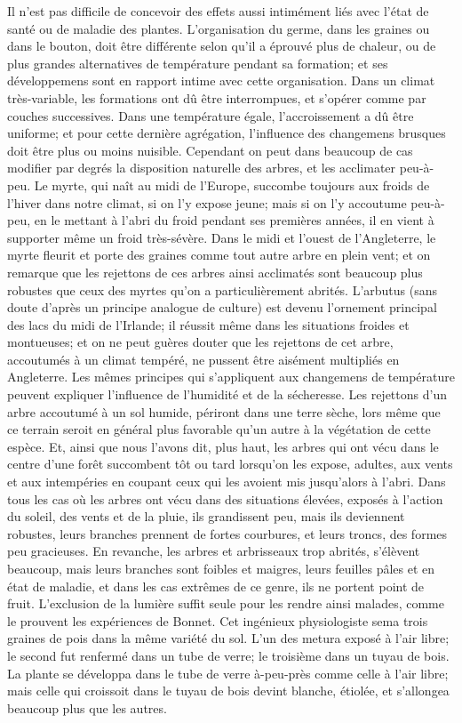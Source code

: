 Il n'est pas difficile de concevoir des effets aussi intimément liés avec l'état de santé ou de maladie des plantes. L'organisation du germe, dans les graines ou dans le bouton, doit être différente selon qu'il a éprouvé plus de chaleur, ou de plus grandes alternatives de température pendant sa formation; et ses développemens sont en rapport intime avec cette organisation. Dans un climat très-variable, les formations ont dû être interrompues, et s'opérer comme par couches successives. Dans une température égale, l'accroissement a dû être uniforme; et pour cette dernière agrégation, l'influence des changemens brusques doit être plus ou moins nuisible.
Cependant on peut dans beaucoup de cas modifier par degrés la disposition naturelle\setcounter{page}{132} des arbres, et les acclimater peu-à-peu. Le myrte, qui naît au midi de l'Europe, succombe toujours aux froids de l'hiver dans notre climat, si on l'y expose jeune; mais si on l'y accoutume peu-à-peu, en le mettant à l'abri du froid pendant ses premières années, il en vient à supporter même un froid très-sévère. Dans le midi et l'ouest de l'Angleterre, le myrte fleurit et porte des graines comme tout autre arbre en plein vent; et on remarque que les rejettons de ces arbres ainsi acclimatés sont beaucoup plus robustes que ceux des myrtes qu'on a particulièrement abrités.
L'arbutus (sans doute d'après un principe analogue de culture) est devenu l'ornement principal des lacs du midi de l'Irlande; il réussit même dans les situations froides et montueuses; et on ne peut guères douter que les rejettons de cet arbre, accoutumés à un climat tempéré, ne pussent être aisément multipliés en Angleterre.
Les mêmes principes qui s'appliquent aux changemens de température peuvent expliquer l'influence de l'humidité et de la sécheresse. Les rejettons d'un arbre accoutumé à un sol humide, périront dans une terre sèche, lors même que ce terrain seroit en général plus favorable qu'un autre à la végétation\setcounter{page}{133} de cette espèce. Et, ainsi que nous l'avons dit, plus haut, les arbres qui ont vécu dans le centre d'une forêt succombent tôt ou tard lorsqu'on les expose, adultes, aux vents et aux intempéries en coupant ceux qui les avoient mis jusqu'alors à l'abri.
Dans tous les cas où les arbres ont vécu dans des situations élevées, exposés à l'action du soleil, des vents et de la pluie, ils grandissent peu, mais ils deviennent robustes, leurs branches prennent de fortes courbures, et leurs troncs, des formes peu gracieuses. En revanche, les arbres et arbrisseaux trop abrités, s'élèvent beaucoup, mais leurs branches sont foibles et maigres, leurs feuilles pâles et en état de maladie, et dans les cas extrêmes de ce genre, ils ne portent point de fruit. L'exclusion de la lumière suffit seule pour les rendre ainsi malades, comme le prouvent les expériences de Bonnet. Cet ingénieux physiologiste sema trois graines de pois dans la même variété du sol. L'un des metura exposé à l'air libre; le second fut renfermé dans un tube de verre; le troisième dans un tuyau de bois. La plante se développa dans le tube de verre à-peu-près comme celle à l'air libre; mais celle qui croissoit dans le tuyau de bois devint blanche, étiolée, et\setcounter{page}{134} s'allongea beaucoup plus que les autres.
